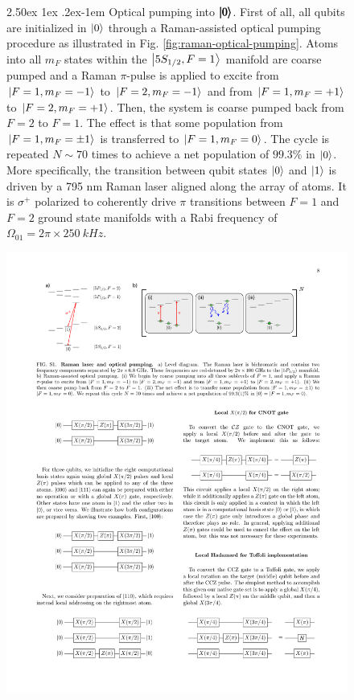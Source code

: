 \documentclass[rmp,10pt,onecolumn,fleqn,notitlepage]{revtex4-1}
\makeatletter
\renewcommand{\paragraph}{%
    \@startsection{paragraph}{4}%
    {\z@}{2.50ex \@plus 1ex \@minus .2ex}{-1em}%
    {\bf\sffamily}%
}
\makeatother
\begin{document}
\begin{figure}[H]
    \fontsize{10pt}{12pt}\selectfont
    \begin{minipage}{0.5\linewidth}\setlength{\parindent}{9pt}
    \paragraph{Optical pumping into $\pmb{\left\vert{0}\right\rangle}$.} First of all, all qubits are initialized in $\left\vert{0}\right\rangle$ through a Raman-assisted optical pumping procedure as illustrated in Fig. \ref{fig:raman-optical-pumping}. Atoms into all $m_F$ states within the $\left\vert{5 S_{1/2}, F=1}\right\rangle$ manifold are coarse pumped and a Raman $\pi$-pulse is applied to excite from $\left\vert{F=1,m_F=-1}\right\rangle$ to $\left\vert{F=2,m_F=-1}\right\rangle$ and from $\left\vert{F=1,m_F=+1}\right\rangle$ to $\left\vert{F=2,m_F=+1}\right\rangle$. Then, the system is coarse pumped back from $F=2$ to $F=1$. The effect is that some population from $\left\vert{F=1,m_F=\pm 1}\right\rangle$ is transferred to $\left\vert{F=1,m_F=0}\right\rangle$. The cycle is repeated $N \sim 70$ times to achieve a net population of $99.3\%$ in $\left\vert{0}\right\rangle$.
    More specifically, the transition between qubit states $\left\vert{0}\right\rangle$ and $\left\vert{1}\right\rangle$ is driven by a 795 nm Raman laser aligned along the array of atoms. It is $\sigma^+$ polarized to coherently drive $\pi$ transitions between $F=1$ and $F=2$ ground state manifolds with a Rabi frequency of $\Omega_{01}= 2 \pi \times \SI{250}{kHz}$. 
    \end{minipage}
    \hfill
    \begin{minipage}{0.45\linewidth}
    \centering
     \includegraphics[width=1\textwidth]{image/physical_implementation/raman-optical-pumping.pdf}

\end{minipage}
\end{figure}
\end{document}
